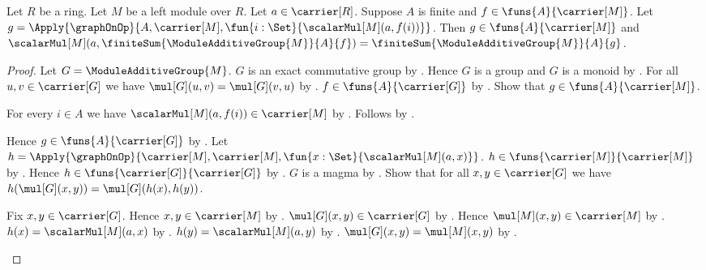 \begin{theorem}\label{module_scalar_finite_sum}
    Let $R$ be a ring.
    Let $M$ be a left module over $R$.
    Let $a\in\carrier[R]$.
    Suppose $A$ is finite and $f\in\funs{A}{\carrier[M]}$.
    Let
        $g=\Apply{\graphOnOp}{
            A,\carrier[M],\fun{i:\Set}{\scalarMul[M](a,f(i))}}$.
    Then $g\in\funs{A}{\carrier[M]}$ and
        $\scalarMul[M](a,
            \finiteSum{\ModuleAdditiveGroup{M}}{A}{f})
        =\finiteSum{\ModuleAdditiveGroup{M}}{A}{g}$.
\end{theorem}
\begin{proof}
    Let $G=\ModuleAdditiveGroup{M}$.
    $G$ is an exact commutative group by
        .
    Hence $G$ is a group and $G$ is a monoid by
        .
    For all $u,v\in\carrier[G]$ we have
        $\mul[G](u,v)=\mul[G](v,u)$ by
        .
    $f\in\funs{A}{\carrier[G]}$ by
        .
    Show that $g\in\funs{A}{\carrier[M]}$.
    \begin{subproof}
        For every $i\in A$ we have
            $\scalarMul[M](a,f(i))\in\carrier[M]$ by
            .
        Follows by .
    \end{subproof}
    Hence $g\in\funs{A}{\carrier[G]}$ by
        .
    Let
        $h=\Apply{\graphOnOp}{
            \carrier[M],\carrier[M],
            \fun{x:\Set}{\scalarMul[M](a,x)}}$.
    $h\in\funs{\carrier[M]}{\carrier[M]}$ by
        .
    Hence $h\in\funs{\carrier[G]}{\carrier[G]}$ by
        .
    $G$ is a magma by .
    Show that for all $x,y\in\carrier[G]$ we have
        $h(\mul[G](x,y))=\mul[G](h(x),h(y))$.
    \begin{subproof}
        Fix $x,y\in\carrier[G]$.
        Hence $x,y\in\carrier[M]$ by
            .
        $\mul[G](x,y)\in\carrier[G]$ by
            .
        Hence $\mul[M](x,y)\in\carrier[M]$ by
            .
        $h(x)=\scalarMul[M](a,x)$ by
            .
        $h(y)=\scalarMul[M](a,y)$ by
            .
        $\mul[G](x,y)=\mul[M](x,y)$ by
            .

\end{subproof}
\end{proof}
